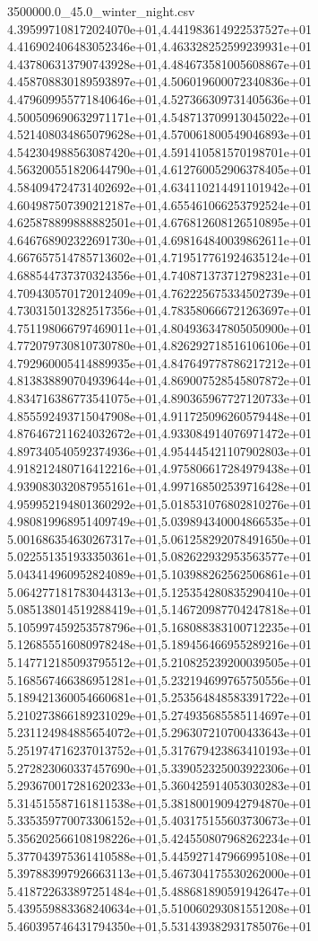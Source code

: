 \begin{filecontents*}{3500000.0_45.0_winter_night.csv}
4.395997108172024070e+01,4.441983614922537527e+01
4.416902406483052346e+01,4.463328252599239931e+01
4.437806313790743928e+01,4.484673581005608867e+01
4.458708830189593897e+01,4.506019600072340836e+01
4.479609955771840646e+01,4.527366309731405636e+01
4.500509690632971171e+01,4.548713709913045022e+01
4.521408034865079628e+01,4.570061800549046893e+01
4.542304988563087420e+01,4.591410581570198701e+01
4.563200551820644790e+01,4.612760052906378405e+01
4.584094724731402692e+01,4.634110214491101942e+01
4.604987507390212187e+01,4.655461066253792524e+01
4.625878899888882501e+01,4.676812608126510895e+01
4.646768902322691730e+01,4.698164840039862611e+01
4.667657514785713602e+01,4.719517761924635124e+01
4.688544737370324356e+01,4.740871373712798231e+01
4.709430570172012409e+01,4.762225675334502739e+01
4.730315013282517356e+01,4.783580666721263697e+01
4.751198066797469011e+01,4.804936347805050900e+01
4.772079730810730780e+01,4.826292718516106106e+01
4.792960005414889935e+01,4.847649778786217212e+01
4.813838890704939644e+01,4.869007528545807872e+01
4.834716386773541075e+01,4.890365967727120733e+01
4.855592493715047908e+01,4.911725096260579448e+01
4.876467211624032672e+01,4.933084914076971472e+01
4.897340540592374936e+01,4.954445421107902803e+01
4.918212480716412216e+01,4.975806617284979438e+01
4.939083032087955161e+01,4.997168502539716428e+01
4.959952194801360292e+01,5.018531076802810276e+01
4.980819968951409749e+01,5.039894340004866535e+01
5.001686354630267317e+01,5.061258292078491650e+01
5.022551351933350361e+01,5.082622932953563577e+01
5.043414960952824089e+01,5.103988262562506861e+01
5.064277181783044313e+01,5.125354280835290410e+01
5.085138014519288419e+01,5.146720987704247818e+01
5.105997459253578796e+01,5.168088383100712235e+01
5.126855516080978248e+01,5.189456466955289216e+01
5.147712185093795512e+01,5.210825239200039505e+01
5.168567466386951281e+01,5.232194699765750556e+01
5.189421360054660681e+01,5.253564848583391722e+01
5.210273866189231029e+01,5.274935685585114697e+01
5.231124984885654072e+01,5.296307210700433643e+01
5.251974716237013752e+01,5.317679423863410193e+01
5.272823060337457690e+01,5.339052325003922306e+01
5.293670017281620233e+01,5.360425914053030283e+01
5.314515587161811538e+01,5.381800190942794870e+01
5.335359770073306152e+01,5.403175155603730673e+01
5.356202566108198226e+01,5.424550807968262234e+01
5.377043975361410588e+01,5.445927147966995108e+01
5.397883997926663113e+01,5.467304175530262000e+01
5.418722633897251484e+01,5.488681890591942647e+01
5.439559883368240634e+01,5.510060293081551208e+01
5.460395746431794350e+01,5.531439382931785076e+01

\end{filecontents*}
